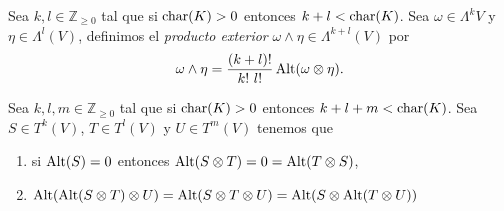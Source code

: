 \begin{defn}
Sea $k,l\in\mathbb{Z}_{\ge 0}$ tal que si $\operatorname{char}(K)>0$ entonces $k+l<\operatorname{char}(K)$. Sea $\omega\in\Lambda^k{V}$ y $\eta\in\Lambda^l(V)$, definimos el \emph{producto exterior} $\omega\wedge\eta\in\Lambda^{k+l}(V)$ por
$$\omega\wedge\eta=\dfrac{(k+l)!}{k!\ l!}\Alt(\omega\otimes\eta).$$
\end{defn}

\begin{lema}\label{lemaalt}
Sea $k,l,m\in\mathbb{Z}_{\ge 0}$  tal que si $\operatorname{char}(K)>0$ entonces $k+l+m<\operatorname{char}(K)$.  Sea $S\in T^k(V)$, $T\in T^l(V)$ y $U\in T^m(V)$ tenemos que
\begin{enumerate}
\item si $\operatorname{Alt}(S)=0$ entonces $\operatorname{Alt}(S\otimes T)=0=\operatorname{Alt}(T\otimes S)$,
\item $\operatorname{Alt}(\operatorname{Alt}(S\otimes T)\otimes U)=\operatorname{Alt}(S\otimes T\otimes U)=\operatorname{Alt}(S\otimes \operatorname{Alt}(T\otimes U))$
\end{enumerate}
\end{lema}

